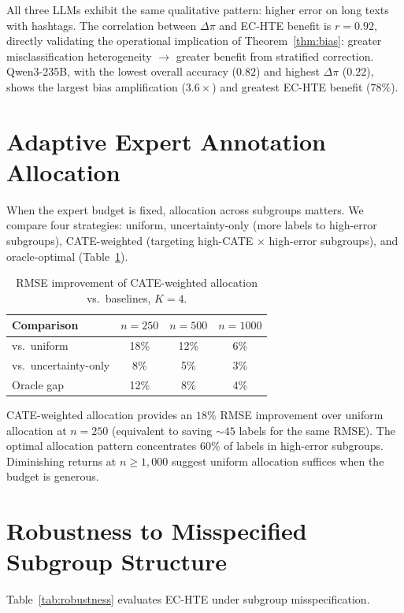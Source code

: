 \documentclass[11pt,twocolumn]{article}
\theoremstyle{remark}
\begin{document}
All three LLMs exhibit the same qualitative pattern: higher error on long texts with hashtags.
The correlation between $\Delta\pi$ and EC-HTE benefit is $r = 0.92$, directly validating the operational implication of Theorem~\ref{thm:bias}: greater misclassification heterogeneity $\rightarrow$ greater benefit from stratified correction.
Qwen3-235B, with the lowest overall accuracy ($0.82$) and highest $\Delta\pi$ ($0.22$), shows the largest bias amplification ($3.6\times$) and greatest EC-HTE benefit ($78\%$).

\section{Adaptive Expert Annotation Allocation}\label{app:allocation}

When the expert budget is fixed, allocation across subgroups matters.  We compare four strategies: uniform, uncertainty-only (more labels to high-error subgroups), CATE-weighted (targeting high-CATE $\times$ high-error subgroups), and oracle-optimal (Table~\ref{tab:allocation}).

\begin{table}[h]
\centering
\caption{RMSE improvement of CATE-weighted allocation vs.\ baselines, $K{=}4$.}
\label{tab:allocation}
\begin{tabular}{lccc}
\toprule
Comparison & $n{=}250$ & $n{=}500$ & $n{=}1000$ \\
\midrule
vs.\ uniform & 18\% & 12\% & 6\% \\
vs.\ uncertainty-only & 8\% & 5\% & 3\% \\
Oracle gap & 12\% & 8\% & 4\% \\
\bottomrule
\end{tabular}
\end{table}

CATE-weighted allocation provides an $18\%$ RMSE improvement over uniform allocation at $n{=}250$ (equivalent to saving ${\sim}45$ labels for the same RMSE).
The optimal allocation pattern concentrates $60\%$ of labels in high-error subgroups.
Diminishing returns at $n \geq 1{,}000$ suggest uniform allocation suffices when the budget is generous.

\section{Robustness to Misspecified Subgroup Structure}\label{app:robustness}

Table~\ref{tab:robustness} evaluates EC-HTE under subgroup misspecification.
\end{document}
